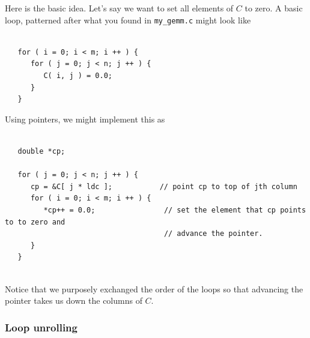 Here is the basic idea.  Let's say we want to set 
all elements of $C $ to zero.  A basic loop, patterned after what you found in {\tt my\_gemm.c} might look like
\begin{verbatim}

   for ( i = 0; i < m; i ++ ) {                   
      for ( j = 0; j < n; j ++ ) {                
         C( i, j ) = 0.0;
      }                                           
   }                                              
\end{verbatim}
Using pointers, we might implement this as
\begin{verbatim}

   double *cp;

   for ( j = 0; j < n; j ++ ) {
      cp = &C[ j * ldc ];           // point cp to top of jth column      
      for ( i = 0; i < m; i ++ ) {                
         *cp++ = 0.0;                // set the element that cp points to to zero and 
                                     // advance the pointer.
      }                                      
   }                 
   
\end{verbatim}
Notice that we purposely exchanged the order of the loops so that advancing the pointer takes us down the columns of $ C $.

\subsubsection{Loop unrolling}

